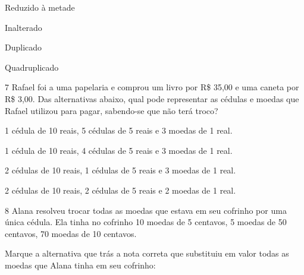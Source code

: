 \begin{escolha}
\item
  Reduzido à metade
\item
  Inalterado
\item
  Duplicado
\item
  Quadruplicado
\end{escolha}


\num{7} Rafael foi a uma papelaria e comprou um livro por R\$ 35,00 e uma
caneta por R\$ 3,00. Das alternativas abaixo, qual pode representar as
cédulas e moedas que Rafael utilizou para pagar, sabendo-se que não terá
troco?

\begin{escolha}
\item
  1 cédula de 10 reais, 5 cédulas de 5 reais e 3 moedas de 1 real.
\item
  1 cédula de 10 reais, 4 cédulas de 5 reais e 3 moedas de 1 real.
\item
  2 cédulas de 10 reais, 1 cédulas de 5 reais e 3 moedas de 1 real.
\item
  2 cédulas de 10 reais, 2 cédulas de 5 reais e 2 moedas de 1 real.
\end{escolha}


\num{8} Alana resolveu trocar todas as moedas que estava em seu cofrinho
por uma única cédula. Ela tinha no cofrinho 10 moedas de 5 centavos, 5
moedas de 50 centavos, 70 moedas de 10 centavos.

Marque a alternativa que trás a nota correta que substituiu em valor
todas as moedas que Alana tinha em seu cofrinho:



